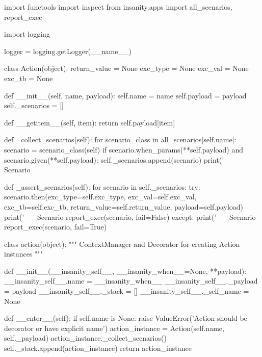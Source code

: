 
\begin{simplecode}
import functools
import inspect
from insanity.apps import all_scenarios, report_exec

import logging

logger = logging.getLogger(__name__)


class Action(object):
    return_value = None
    exc_type = None
    exc_val = None
    exc_tb = None

    def __init__(self, name, payload):
        self.name = name
        self.payload = payload
        self._scenarios = []

    def __getitem__(self, item):
        return self.payload[item]

    def _collect_scenarios(self):
        for scenario_class in all_scenarios[self.name]:
            scenario = scenario_class(self)
            if scenario.when_params(**self.payload) and scenario.given(**self.payload):
                self._scenarios.append(scenario)
                print('~~~ Scenario %

    def _assert_scenarios(self):
        for scenario in self._scenarios:
            try:
                scenario.then(exc_type=self.exc_type, exc_val=self.exc_val, exc_tb=self.exc_tb,
                              return_value=self.return_value, payload=self.payload)
                print('~~~ Scenario %
                report_exec(scenario, fail=False)
            except:
                print('~~~ Scenario %
                report_exec(scenario, fail=True)


class action(object):
    """
    ContextManager and Decorator for creating Action instances
    """

    def __init__(__insanity_self__, __insanity_when__=None, **payload):
        __insanity_self__.name = __insanity_when__
        __insanity_self__._payload = payload
        __insanity_self__._stack = []
        __insanity_self__._self_name = None

    def __enter__(self):
        if self.name is None:
            raise ValueError('Action should be decorator or have explicit name')
        action_instance = Action(self.name, self._payload)
        action_instance._collect_scenarios()
        self._stack.append(action_instance)
        return action_instance


\end{simplecode}
